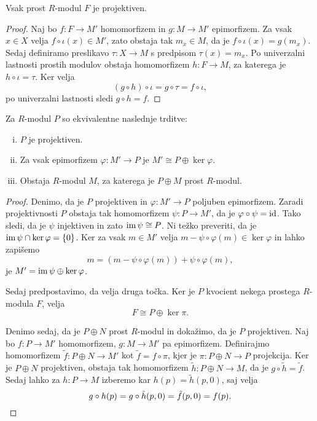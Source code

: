 \begin{trditev}
Vsak prost $R$-modul $F$ je projektiven.
\end{trditev}

\begin{proof}
Naj bo $f \colon F \to M'$ homomorfizem in $g \colon M \to M'$
epimorfizem. Za vsak $x \in X$ velja $f \circ \iota(x) \in M'$,
zato obstaja tak $m_x \in M$, da je $f \circ \iota(x) = g(m_x)$.
Sedaj definiramo preslikavo $\tau \colon X \to M$ s predpisom
$\tau(x) = m_x$. Po univerzalni lastnosti prostih modulov obstaja
homomorfizem $h \colon F \to M$, za katerega je
$h \circ \iota = \tau$. Ker velja
\[
(g \circ h) \circ \iota = g \circ \tau = f \circ \iota,
\]
po univerzalni lastnosti sledi $g \circ h = f$.
\end{proof}

\begin{izrek}
Za $R$-modul $P$ so ekvivalentne naslednje trditve:

\begin{enumerate}[i)]
\item $P$ je projektiven.
\item Za vsak epimorfizem $\varphi \colon M' \to P$ je
$M' \cong P \oplus \ker \varphi$.
\item Obstaja $R$-modul $M$, za katerega je $P \oplus M$ prost
$R$-modul.
\end{enumerate}
\end{izrek}

\begin{proof}
Denimo, da je $P$ projektiven in $\varphi \colon M' \to P$ poljuben
epimorfizem. Zaradi projektivnosti $P$ obstaja tak homomorfizem
$\psi \colon P \to M'$, da je $\varphi \circ \psi = \operatorname{id}$. Tako
sledi, da je $\psi$ injektiven in zato $\operatorname{im} \psi \cong P$. Ni težko
preveriti, da je $\operatorname{im} \psi \cap \ker \varphi = \left\{0\right\}$. Ker za
vsak $m \in M'$ velja $m - \psi \circ \varphi(m) \in \ker \varphi$
in lahko zapišemo
\[
m = (m - \psi \circ \varphi(m)) + \psi \circ \varphi(m),
\]
je $M' = \operatorname{im} \psi \oplus \ker \varphi$.

Sedaj predpostavimo, da velja druga točka. Ker je $P$ kvocient
nekega prostega $R$-modula $F$, velja
\[
F \cong P \oplus \ker \pi.
\]

Denimo sedaj, da je $P \oplus N$ prost $R$-modul in dokažimo, da je
$P$ projektiven. Naj bo $f \colon P \to M'$ homomorfizem,
$g \colon M \to M'$ pa epimorfizem. Definirajmo homomorfizem
$\tilde{f} \colon P \oplus N \to M'$ kot $\tilde{f} = f \circ \pi$,
kjer je $\pi \colon P \oplus N \to P$ projekcija. Ker je
$P \oplus N$ projektiven, obstaja tak homomorfizem
$\tilde{h} \colon P \oplus N \to M$, da je
$g \circ \tilde{h} = \tilde{f}$. Sedaj lahko za $h \colon P \to M$
izberemo kar $h(p) = \tilde{h}(p, 0)$, saj velja
\[
g \circ h(p) = g \circ \tilde{h}(p,0) = \tilde{f}(p,0) = f(p).
\qedhere
\]
\end{proof}

